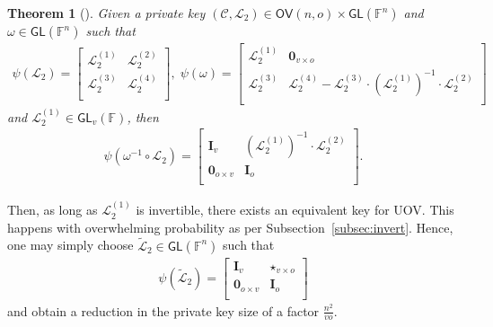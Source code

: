 \documentclass[12pt, a4paper, oneside]{memoir}
\newtheorem{theorem}{Theorem}[section]
\theoremstyle{definition}
\begin{document}
\begin{theorem}[{\cite[Theorem 2]{Beullens:201706}}]
  Given a private key $(\mathcal{C}, \mathcal{L}_{2}) \in \mathsf{OV}(n, o) \times \mathsf{GL}(\mathbb{F}^{n})$ and $\omega \in \mathsf{GL}(\mathbb{F}^{n})$ such that
  \begin{align}
    \psi(\mathcal{L}_{2}) =
    \begin{bmatrix}
      \mathcal{L}_{2}^{(1)} & \mathcal{L}_{2}^{(2)} \\
      \mathcal{L}_{2}^{(3)} & \mathcal{L}_{2}^{(4)} \\
    \end{bmatrix},\;
    \psi(\omega) =
    \begin{bmatrix}
      \mathcal{L}_{2}^{(1)} & \mathbf{0}_{v \times o} \\
      \mathcal{L}_{2}^{(3)} & \mathcal{L}_{2}^{(4)} -\mathcal{L}_{2}^{(3)} \cdot (\mathcal{L}_{2}^{(1)})^{-1} \cdot \mathcal{L}_{2}^{(2)} \\
    \end{bmatrix}
  \end{align}
  and $\mathcal{L}_{2}^{(1)} \in \mathsf{GL}_{v}(\mathbb{F})$, then
  \begin{align}
    \psi(\omega^{-1} \circ \mathcal{L}_{2}) = \begin{bmatrix}
      \mathbf{I}_{v} & (\mathcal{L}_{2}^{(1)})^{-1} \cdot \mathcal{L}_{2}^{(2)} \\
      \mathbf{0}_{o \times v} & \mathbf{I}_{o} \\
    \end{bmatrix}.
  \end{align}
\end{theorem}

Then, as long as $\mathcal{L}_{2}^{(1)}$ is invertible, there exists an equivalent key for UOV. This happens with overwhelming probability as per Subsection~\ref{subsec:invert}. Hence, one may simply choose $\widetilde{\mathcal{L}}_{2} \in \mathsf{GL}(\mathbb{F}^{n})$ such that
\begin{align}
  \psi(\widetilde{\mathcal{L}}_{2}) =
  \begin{bmatrix}
    \mathbf{I}_{v}          & \star_{v \times o} \\
    \mathbf{0}_{o \times v} & \mathbf{I}_{o} \\
  \end{bmatrix}
\end{align}
and obtain a reduction in the private key size of a factor $\frac{n^{2}}{v o}$.
\end{document}
